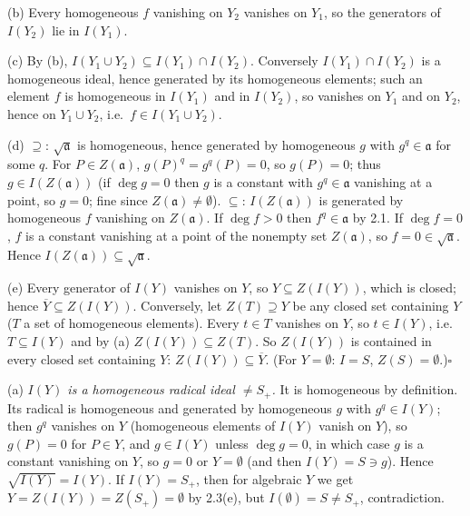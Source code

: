 \documentclass[11pt]{article}
\begin{document}
(b) Every homogeneous $f$ vanishing on $Y_2$ vanishes on $Y_1$, so the generators of $I(Y_2)$ lie in $I(Y_1)$.

(c) By (b), $I(Y_1\cup Y_2)\subseteq I(Y_1)\cap I(Y_2)$. Conversely $I(Y_1)\cap I(Y_2)$ is a homogeneous ideal, hence generated by its homogeneous elements; such an element $f$ is homogeneous in $I(Y_1)$ and in $I(Y_2)$, so vanishes on $Y_1$ and on $Y_2$, hence on $Y_1\cup Y_2$, i.e.\ $f\in I(Y_1\cup Y_2)$.

(d) $\supseteq$: $\sqrt{\mathfrak a}$ is homogeneous, hence generated by homogeneous $g$ with $g^q\in\mathfrak a$ for some $q$. For $P\in Z(\mathfrak a)$, $g(P)^q=g^q(P)=0$, so $g(P)=0$; thus $g\in I(Z(\mathfrak a))$ (if $\deg g=0$ then $g$ is a constant with $g^q\in\mathfrak a$ vanishing at a point, so $g=0$; fine since $Z(\mathfrak a)\ne\emptyset$). $\subseteq$: $I(Z(\mathfrak a))$ is generated by homogeneous $f$ vanishing on $Z(\mathfrak a)$. If $\deg f>0$ then $f^q\in\mathfrak a$ by 2.1. If $\deg f=0$, $f$ is a constant vanishing at a point of the nonempty set $Z(\mathfrak a)$, so $f=0\in\sqrt{\mathfrak a}$. Hence $I(Z(\mathfrak a))\subseteq\sqrt{\mathfrak a}$.

(e) Every generator of $I(Y)$ vanishes on $Y$, so $Y\subseteq Z(I(Y))$, which is closed; hence $\overline Y\subseteq Z(I(Y))$. Conversely, let $Z(T)\supseteq Y$ be any closed set containing $Y$ ($T$ a set of homogeneous elements). Every $t\in T$ vanishes on $Y$, so $t\in I(Y)$, i.e.\ $T\subseteq I(Y)$ and by (a) $Z(I(Y))\subseteq Z(T)$. So $Z(I(Y))$ is contained in every closed set containing $Y$: $Z(I(Y))\subseteq\overline Y$. (For $Y=\emptyset$: $I=S$, $Z(S)=\emptyset$.)\hfill$\square$

\pf
(a) \emph{$I(Y)$ is a homogeneous radical ideal $\ne S_+$.} It is homogeneous by definition. Its radical is homogeneous and generated by homogeneous $g$ with $g^q\in I(Y)$; then $g^q$ vanishes on $Y$ (homogeneous elements of $I(Y)$ vanish on $Y$), so $g(P)=0$ for $P\in Y$, and $g\in I(Y)$ unless $\deg g=0$, in which case $g$ is a constant vanishing on $Y$, so $g=0$ or $Y=\emptyset$ (and then $I(Y)=S\ni g$). Hence $\sqrt{I(Y)}=I(Y)$. If $I(Y)=S_+$, then for algebraic $Y$ we get $Y=Z(I(Y))=Z(S_+)=\emptyset$ by 2.3(e), but $I(\emptyset)=S\ne S_+$, contradiction.
\end{document}
